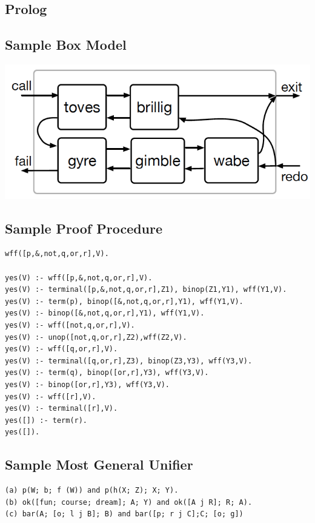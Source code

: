 \documentclass[10pt,landscape,a4paper]{article}
\begin{document}
\tiny


\begin{multicols*}{5}

\section{Prolog}

\subsection*{Sample Box Model}
\includegraphics[scale=0.15]{box_model}

\subsection*{Sample Proof Procedure}
\begin{verbatim}
wff([p,&,not,q,or,r],V).

yes(V) :- wff([p,&,not,q,or,r],V).
yes(V) :- terminal([p,&,not,q,or,r],Z1), binop(Z1,Y1), wff(Y1,V).
yes(V) :- term(p), binop([&,not,q,or,r],Y1), wff(Y1,V).
yes(V) :- binop([&,not,q,or,r],Y1), wff(Y1,V).
yes(V) :- wff([not,q,or,r],V).
yes(V) :- unop([not,q,or,r],Z2),wff(Z2,V).
yes(V) :- wff([q,or,r],V).
yes(V) :- terminal([q,or,r],Z3), binop(Z3,Y3), wff(Y3,V).
yes(V) :- term(q), binop([or,r],Y3), wff(Y3,V).
yes(V) :- binop([or,r],Y3), wff(Y3,V).
yes(V) :- wff([r],V).
yes(V) :- terminal([r],V).
yes([]) :- term(r).
yes([]).
\end{verbatim}

\subsection*{Sample Most General Unifier}
\begin{verbatim}
(a) p(W; b; f (W)) and p(h(X; Z); X; Y).
(b) ok([fun; course; dream]; A; Y) and ok([A j R]; R; A).
(c) bar(A; [o; l j B]; B) and bar([p; r j C];C; [o; g])


\end{verbatim}
\end{multicols*}
\end{document}
